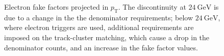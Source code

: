 \begin{figure}[h] 
  \centering
  \caption{Electron fake factors projected in $p_{\mathrm{T}}$. The discontinuity at $\SI{24}{\giga\electronvolt}$ is due to a change in the the denominator requirements; below $\SI{24}{\giga\electronvolt}$, where electron triggers are used, additional requirements are imposed on the track-cluster matching, which cause a drop in the denominator counts, and an increase in the fake factor values.}
  \label{fig:electron-fake-factors-1D-pt}
\end{figure}

